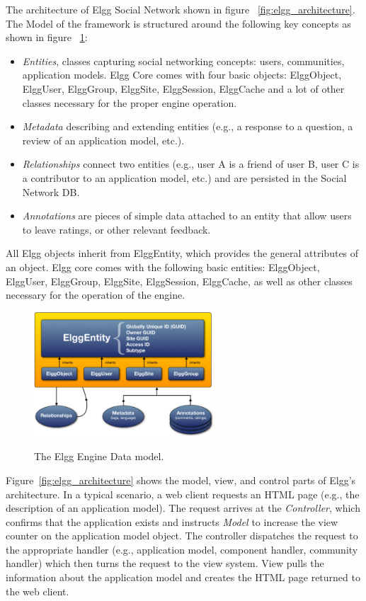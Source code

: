 The architecture of Elgg Social Network shown in figure ~\ref{fig:elgg_architecture}. The Model of the framework is structured around the following key concepts as shown in figure ~\ref{fig:elgg_entities}:
\begin{itemize}
\item \emph{Entities}, classes capturing social networking concepts: users, communities, application models. Elgg Core comes with four basic objects: ElggObject, ElggUser, ElggGroup, ElggSite, ElggSession, ElggCache and a lot of other classes necessary for the proper engine operation.
\item \emph{Metadata} describing and extending entities (e.g., a response to a question, a review of an application model, etc.).
\item  \emph{Relationships} connect two entities (e.g., user A is a friend of user B, user C is a contributor to an application model, etc.) and are persisted in the Social Network DB.
\item \emph{Annotations} are pieces of simple data attached to an entity that allow users to leave ratings, or other relevant feedback.
\end{itemize}
All Elgg objects inherit from ElggEntity, which provides the general attributes of an object. Elgg core comes with the following basic entities: ElggObject, ElggUser, ElggGroup, ElggSite, ElggSession, ElggCache, as well as other classes necessary for the operation of the engine.

\begin{figure}[h]
	\caption{The Elgg Engine Data model.}
	\includegraphics[width=0.6\textwidth,natwidth=200,natheight=150]{./fig/elgg_data_model.png}
	\centering
	\label{fig:elgg_entities}
\end{figure}

Figure~\ref{fig:elgg_architecture} shows the model, view, and control parts of Elgg's architecture. In a typical scenario, a web client requests an HTML page (e.g., the description of an application model).  The request arrives at the \emph{Controller}, which confirms that the application exists and instructs \emph{Model} to increase the view counter on the application model object. The controller dispatches the request to the appropriate handler (e.g., application model, component handler, community handler) which then turns the request to the view system. View pulls the information about the application model and creates the HTML page returned to the web client.

